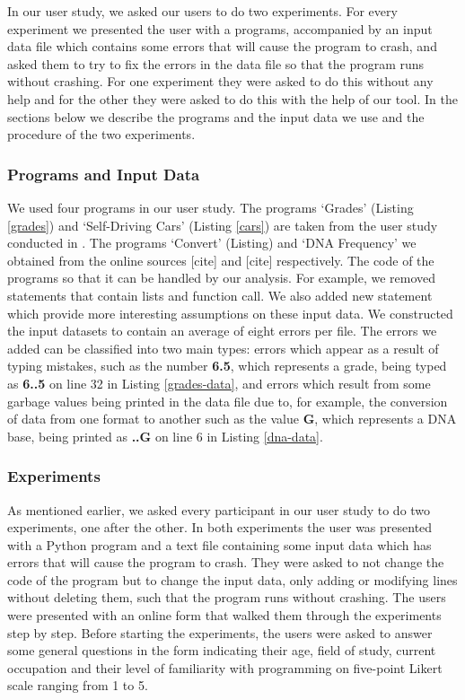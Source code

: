 \documentclass[10pt]{report}
\begin{document}
In our user study, we asked our users to do two experiments. For every experiment we presented the user with a programs, accompanied by an input data file which contains some errors that will cause the program to crash, and asked them to try to fix the errors in the data file so that the program runs without crashing. For one experiment they were asked to do this without any help and for the other they were asked to do this with the help of our tool. In the sections below we describe the programs and the input data we use and the procedure of the two experiments.

\subsubsection{Programs and Input Data}

We used four programs in our user study. The programs `Grades' (Listing \ref{grades}) and `Self-Driving Cars' (Listing \ref{cars}) are taken from the user study conducted in \cite{madelin}. The programs `Convert' (Listing) and `DNA Frequency' we obtained from the online sources [cite] and [cite] respectively. The code of the programs so that it can be handled by our analysis. For example, we removed statements that contain lists and function call. We also added new statement which provide more interesting assumptions on these input data. We constructed the input datasets to contain an average of eight errors per file. The errors we added can be classified into two main types: errors which appear as a result of typing mistakes, such as the number \textbf{6.5}, which represents a grade, being typed as \textbf{6..5} on line 32 in Listing \ref{grades-data}, and errors which result from some garbage values being printed in the data file due to, for example, the conversion of data from one format to another such as the value \textbf{G}, which represents a DNA base, being printed as \textbf{..G} on line 6 in Listing \ref{dna-data}.   \\ 

\subsubsection{Experiments}
As mentioned earlier, we asked every participant in our user study to do two experiments, one after the other. In both experiments the user was presented with a Python program and a text file containing some input data which has errors that will cause the program to crash. They were asked to not change the code of the program but to change the input data, only adding or modifying lines without deleting them, such that the program runs without crashing. The users were presented with an online form that walked them through the experiments step by step. Before starting the experiments, the users were asked to answer some general questions in the form indicating their age, field of study, current occupation and their level of familiarity with programming on five-point Likert scale ranging from 1 to 5. 
\end{document}
